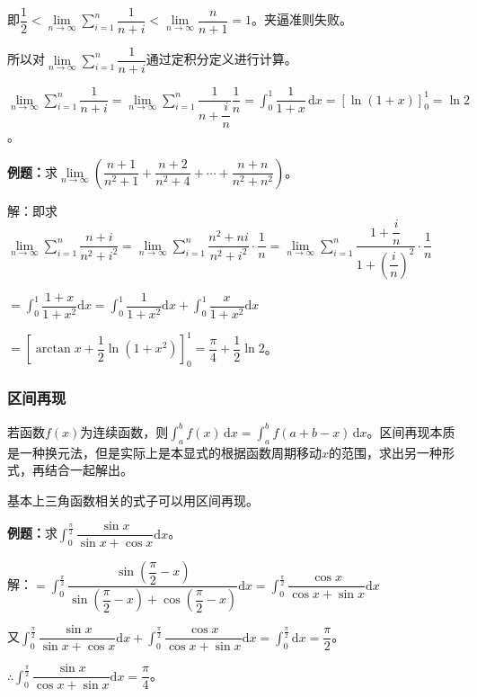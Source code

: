 \documentclass[UTF8, 12pt]{ctexart}
\begin{document}
即$\dfrac{1}{2}<\lim\limits_{n\to\infty}\sum\limits_{i=1}^n\dfrac{1}{n+i}<\lim\limits_{n\to\infty}\dfrac{n}{n+1}=1$。夹逼准则失败。

所以对$\lim\limits_{n\to\infty}\sum\limits_{i=1}^n\dfrac{1}{n+i}$通过定积分定义进行计算。

$\lim\limits_{n\to\infty}\sum\limits_{i=1}^n\dfrac{1}{n+i}=\lim\limits_{n\to\infty}\sum\limits_{i=1}^n\dfrac{1}{n+\dfrac{i}{n}}\dfrac{1}{n}=\displaystyle{\int_0^1\dfrac{1}{1+x}\,\textrm{d}x}=[\ln(1+x)]_0^1=\ln2$。

\textbf{例题：}求$\lim\limits_{n\to\infty}\left(\dfrac{n+1}{n^2+1}+\dfrac{n+2}{n^2+4}+\cdots+\dfrac{n+n}{n^2+n^2}\right)$。

解：即求$\lim\limits_{n\to\infty}\sum\limits_{i=1}^n\dfrac{n+i}{n^2+i^2}=\lim\limits_{n\to\infty}\sum\limits_{i=1}^n\dfrac{n^2+ni}{n^2+i^2}\cdot\dfrac{1}{n}=\lim\limits_{n\to\infty}\sum\limits_{i=1}^n\dfrac{1+\dfrac{i}{n}}{1+\left(\dfrac{i}{n}\right)^2}\cdot\dfrac{1}{n}$

$=\displaystyle{\int_0^1\dfrac{1+x}{1+x^2}\textrm{d}x}=\displaystyle{\int_0^1\dfrac{1}{1+x^2}\textrm{d}x+\int_0^1\dfrac{x}{1+x^2}\textrm{d}x}$

$=\left[\arctan x+\dfrac{1}{2}\ln(1+x^2)\right]_0^1=\dfrac{\pi}{4}+\dfrac{1}{2}\ln2$。

\subsubsection{区间再现}

若函数$f(x)$为连续函数，则$\int_a^bf(x)\,\textrm{d}x=\int_a^bf(a+b-x)\,\textrm{d}x$。区间再现本质是一种换元法，但是实际上是本显式的根据函数周期移动$x$的范围，求出另一种形式，再结合一起解出。

基本上三角函数相关的式子可以用区间再现。

\textbf{例题：}求$\displaystyle{\int_0^\frac{\pi}{2}\dfrac{\sin x}{\sin x+\cos x}\textrm{d}x}$。

解：$=\displaystyle{\int_0^\frac{\pi}{2}\dfrac{\sin(\dfrac{\pi}{2}-x)}{\sin(\dfrac{\pi}{2}-x)+\cos(\dfrac{\pi}{2}-x)}\textrm{d}x=\int_0^\frac{\pi}{2}\dfrac{\cos x}{\cos x+\sin x}\textrm{d}x}$

又$\displaystyle{\int_0^\frac{\pi}{2}\dfrac{\sin x}{\sin x+\cos x}\textrm{d}x+\int_0^\frac{\pi}{2}\dfrac{\cos x}{\cos x+\sin x}\textrm{d}x}$$=\int_0^\frac{\pi}{2}\textrm{d}x=\dfrac{\pi}{2}$。

$\therefore\displaystyle{\int_0^\frac{\pi}{2}\dfrac{\sin x}{\cos x+\sin x}\textrm{d}x}=\dfrac{\pi}{4}$。
\end{document}
